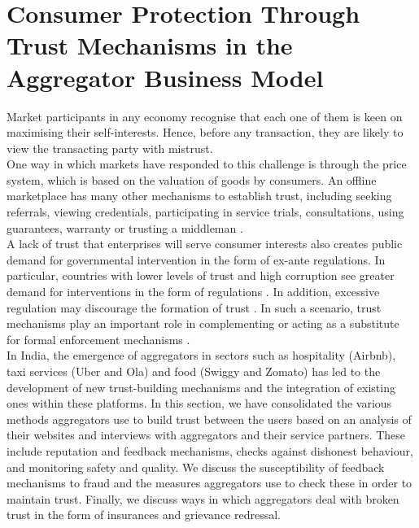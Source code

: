 \documentclass[a4paper, 12pt, twoside]{article}
\begin{document}
                    \section{Consumer Protection Through Trust Mechanisms in the Aggregator Business Model}
                    
                    Market participants in any economy recognise that each one of them is keen on maximising their self-interests. Hence, before any transaction, they are likely to view the transacting party with mistrust.\\
                    
                    One way in which markets have responded to this challenge is through the price system, which is based on the valuation of goods by consumers. An offline marketplace has many other mechanisms to establish trust, including seeking referrals, viewing credentials, participating in service trials, consultations, using guarantees, warranty or trusting a middleman \parencite{thierer2015internet}.\\
                    
                  A lack of trust that enterprises will serve consumer interests also creates public demand for governmental intervention in the form of ex-ante regulations. In particular, countries with lower levels of trust and high corruption see greater demand for interventions in the form of regulations \parencite{aghionpaper}. In addition, excessive regulation may discourage the formation of trust \parencite{aghionpaper}. In such a scenario, trust mechanisms play an important role in complementing or acting as a substitute for formal enforcement mechanisms \parencite{thierer2015internet}. \\
                    
                    In India, the emergence of aggregators in sectors such as hospitality (Airbnb), taxi services (Uber and Ola) and food (Swiggy and Zomato) has led to the development of new trust-building mechanisms and the integration of existing ones within these platforms. In this section, we have consolidated the various methods aggregators use to build trust between the users based on an analysis of their websites and interviews with aggregators and their service partners. These include reputation and feedback mechanisms, checks against dishonest behaviour, and monitoring safety and quality. We discuss the susceptibility of feedback mechanisms to fraud and the measures aggregators use to check these in order to maintain trust. Finally, we discuss ways in which aggregators deal with broken trust in the form of insurances and grievance redressal.
                    
\end{document}

